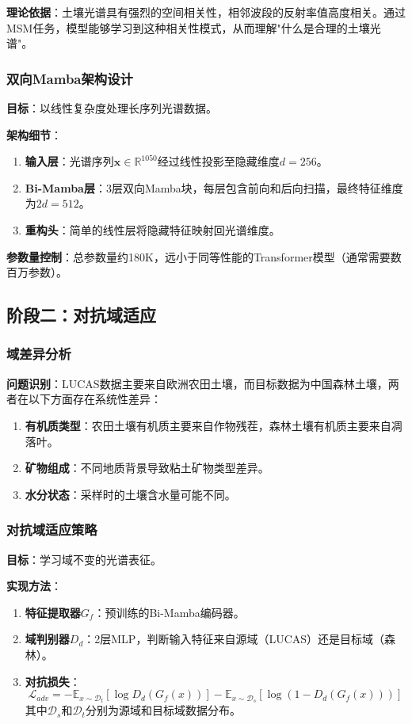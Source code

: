 \documentclass[12pt, a4paper]{article}
\begin{document}
\textbf{理论依据}：土壤光谱具有强烈的空间相关性，相邻波段的反射率值高度相关。通过MSM任务，模型能够学习到这种相关性模式，从而理解"什么是合理的土壤光谱"。

\subsubsection{双向Mamba架构设计}
\textbf{目标}：以线性复杂度处理长序列光谱数据。

\textbf{架构细节}：
\begin{enumerate}
    \item \textbf{输入层}：光谱序列$\mathbf{x} \in \mathbb{R}^{1050}$经过线性投影至隐藏维度$d=256$。
    \item \textbf{Bi-Mamba层}：3层双向Mamba块，每层包含前向和后向扫描，最终特征维度为$2d=512$。
    \item \textbf{重构头}：简单的线性层将隐藏特征映射回光谱维度。
\end{enumerate}

\textbf{参数量控制}：总参数量约180K，远小于同等性能的Transformer模型（通常需要数百万参数）。

\subsection{阶段二：对抗域适应}

\subsubsection{域差异分析}
\textbf{问题识别}：LUCAS数据主要来自欧洲农田土壤，而目标数据为中国森林土壤，两者在以下方面存在系统性差异：
\begin{enumerate}
    \item \textbf{有机质类型}：农田土壤有机质主要来自作物残茬，森林土壤有机质主要来自凋落叶。
    \item \textbf{矿物组成}：不同地质背景导致粘土矿物类型差异。
    \item \textbf{水分状态}：采样时的土壤含水量可能不同。
\end{enumerate}

\subsubsection{对抗域适应策略}
\textbf{目标}：学习域不变的光谱表征。

\textbf{实现方法}：
\begin{enumerate}
    \item \textbf{特征提取器}$G_f$：预训练的Bi-Mamba编码器。
    \item \textbf{域判别器}$D_d$：2层MLP，判断输入特征来自源域（LUCAS）还是目标域（森林）。
    \item \textbf{对抗损失}：
    \begin{equation}
        \mathcal{L}_{adv} = -\mathbb{E}_{x \sim \mathcal{D}_t}[\log D_d(G_f(x))] - \mathbb{E}_{x \sim \mathcal{D}_s}[\log(1-D_d(G_f(x)))]
    \end{equation}
    其中$\mathcal{D}_s$和$\mathcal{D}_t$分别为源域和目标域数据分布。
\end{enumerate}
\end{document}
